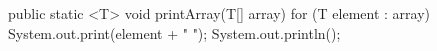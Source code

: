 \begin{unipdcode}[language=Java]
public static <T> void printArray(T[] array) {
    for (T element : array)
        System.out.print(element + " ");
    System.out.println();
}
\end{unipdcode}
